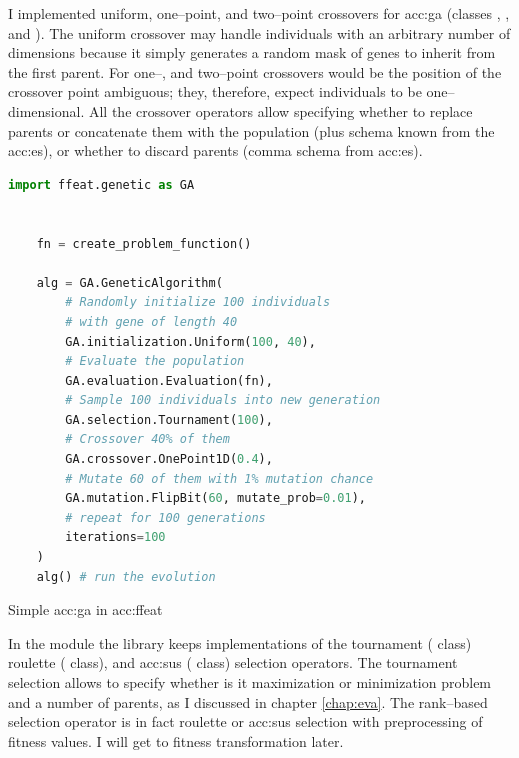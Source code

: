 I implemented uniform, one--point, and two--point crossovers for \acrshort{acc:ga} (classes , , and ). The uniform crossover may handle individuals with an arbitrary number of dimensions because it simply generates a random mask of genes to inherit from the first parent. For one--, and two--point crossovers would be the position of the crossover point ambiguous; they, therefore, expect individuals to be one--dimensional.
All the crossover operators allow specifying whether to replace parents or concatenate them with the population (plus schema known from the \acrshort{acc:es}), or whether to discard parents (comma schema from \acrshort{acc:es}).

\begin{algorithm}[b!]
    \begin{lstlisting}[language=Python, xrightmargin=18pt]
    import ffeat.genetic as GA
    
    
    fn = create_problem_function()
    
    alg = GA.GeneticAlgorithm(
        # Randomly initialize 100 individuals 
        # with gene of length 40
        GA.initialization.Uniform(100, 40),
        # Evaluate the population
        GA.evaluation.Evaluation(fn),
        # Sample 100 individuals into new generation
        GA.selection.Tournament(100),
        # Crossover 40% of them
        GA.crossover.OnePoint1D(0.4),
        # Mutate 60 of them with 1% mutation chance
        GA.mutation.FlipBit(60, mutate_prob=0.01),
        # repeat for 100 generations
        iterations=100
    )
    alg() # run the evolution
    \end{lstlisting}
    \caption{Simple \acrshort*{acc:ga} in \acrshort*{acc:ffeat}}
    \label{alg:gaffeat}
    \end{algorithm}

In the  module the library keeps implementations of the 
tournament ( class)
roulette ( class), 
and \acrlong{acc:sus} ( class)
selection operators. The tournament selection allows to specify whether is it maximization or minimization problem and a number of parents, as I discussed in chapter \ref{chap:eva}. The rank--based selection operator is in fact roulette or \acrshort{acc:sus} selection with preprocessing of fitness values. I will get to fitness transformation later.

